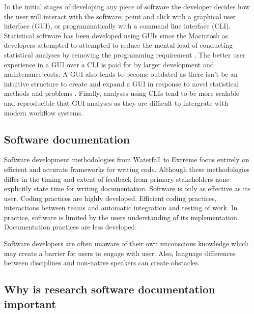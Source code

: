\documentclass[../main.tex]{subfiles}
\begin{document}
In the initial stages of developing any piece of software the developer decides how the user will interact with the software: point and click with a graphical user interface (GUI), or programmatically with a command line interface (CLI).
Statistical software has been developed using GUIs since the Macintosh as developers attempted to attempted to reduce the mental load of conducting statistical analyses by removing the programming requirement \parencite{ValeroMora2012}. 
The better user experience in a GUI over a CLI \parencite{Staggers2000} is paid for by larger development and maintenance costs.
A GUI also tends to become outdated as there isn't be an intuitive structure to create and expand a GUI in response to novel statistical methods and problems \parencite{Unwin2012}.
Finally, analyses using CLIs tend to be more scalable and reproducible that GUI analyses as they are difficult to intergrate with modern workflow systems. 


\subsection{Software documentation}

Software development methodologies from Waterfall to Extreme focus entirely on efficient and accurate frameworks for writing code. 
Although these methodologies differ in the timing and extent of feedback from primary stakeholders none explicitly state time for writing documentation. 
Software is only as effective as its user.
Coding practices are highly developed. Efficient coding practices, interactions between teams and automatic integration and testing of work. In practice, software is limited by the users understanding of its implementation.
Documentation practices are less developed.

Software developers are often unaware of their own unconscious knowledge which may create a barrier for users to engage with user. 
Also, language differences between disciplines and non-native speakers can create obstacles.

\subsection{Why is research software documentation important}
\end{document}
